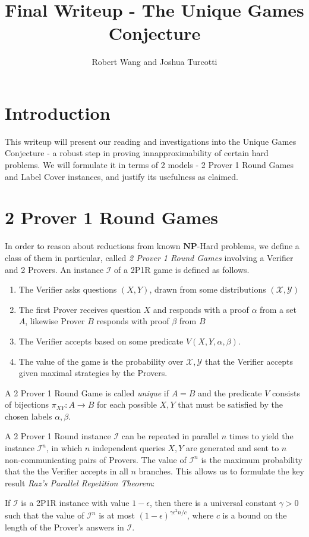 \documentclass{article}
\title{Final Writeup - The Unique Games Conjecture}
\author{Robert Wang and Joshua Turcotti}
\newcommand{\NP}{\ensuremath{\mathbf{NP}}}
\newcommand{\X}{\mathcal{X}}
\newcommand{\Y}{\mathcal{Y}}
\renewcommand{\a}{\alpha}
\renewcommand{\b}{\beta}
\newcommand{\g}{\gamma}
\newcommand{\e}{\epsilon}
\newcommand{\I}{\mathcal{I}}
\newcommand{\1}{\mathbbm{1}}
\begin{document}
\maketitle
\section{Introduction}

This writeup will present our reading and investigations into the Unique Games Conjecture - a robust step in proving innapproximability of certain hard problems. We will formulate it in terms of 2 models - 2 Prover 1 Round Games and Label Cover instances, and justify its usefulness as claimed.

\section{2 Prover 1 Round Games}


In order to reason about reductions from known \NP-Hard problems, we define a class of them in particular, called \textit{2 Prover 1 Round Games} involving a Verifier and 2 Provers. An instance $\I$ of a 2P1R game is defined as follows.
\begin{enumerate}
\item The Verifier asks questions $(X, Y)$, drawn from some distributions $(\X, \Y)$
\item The first Prover receives question $X$ and responds with a proof $\alpha$ from a set $A$, likewise Prover $B$ responds with proof $\beta$ from $B$
\item The Verifier accepts based on some predicate $V(X, Y, \alpha, \beta)$.
\item The value of the game is the probability over $\X, \Y$ that the Verifier accepts given maximal strategies by the Provers.
\end{enumerate}
A 2 Prover 1 Round Game is called \textit{unique} if $A = B$ and the predicate $V$ consists of bijections $\pi_{XY}: A \to B$ for each possible $X, Y$ that must be satisfied by the chosen labels $\a, \b$.



A 2 Prover 1 Round instance $\I$ can be repeated in parallel $n$ times to yield the instance $\I^n$, in which $n$ independent queries $X, Y$ are generated and sent to $n$ non-communicating pairs of Provers. The value of $\I^n$ is the maximum probability that the the Verifier accepts in all $n$ branches. This allows us to formulate the key result \textit{Raz's Parallel Repetition Theorem}:
\begin{theorem}
  If $\I$ is a 2P1R instance with value $1 - \e$, then there is a universal constant $\g > 0$ such that the value of $\I^n$ is at most $(1 - \e)^{\g \e^2 n/c}$, where $c$ is a bound on the length of the Prover's answers in $\I$.
\end{theorem}
\end{document}

